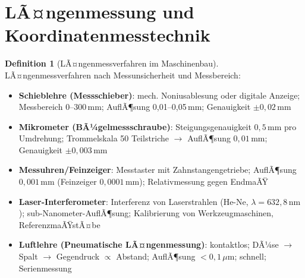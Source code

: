 ﻿\documentclass[a4paper,12pt]{report}
\theoremstyle{definition}
\newtheorem{definition}{Definition}
\begin{document}

\section{LÃ¤ngenmessung und Koordinatenmesstechnik}

\begin{definition}[LÃ¤ngenmessverfahren im Maschinenbau]
LÃ¤ngenmessverfahren nach Messunsicherheit und Messbereich:
\begin{itemize}
    \item[-] \textbf{Schieblehre (Messschieber)}: mech. Noniusablesung oder digitale Anzeige;
          Messbereich 0--300\,mm; AuflÃ¶sung 0{,}01--0{,}05\,mm; Genauigkeit $\pm 0{,}02\,\mathrm{mm}$
    \item[-] \textbf{Mikrometer (BÃ¼gelmessschraube)}: Steigungsgenauigkeit $0{,}5\,\mathrm{mm}$
          pro Umdrehung; Trommelskala 50 Teilstriche $\to$ AuflÃ¶sung $0{,}01\,\mathrm{mm}$;
          Genauigkeit $\pm 0{,}003\,\mathrm{mm}$
    \item[-] \textbf{Messuhren/Feinzeiger}: Messtaster mit Zahnstangengetriebe;
          AuflÃ¶sung $0{,}001\,\mathrm{mm}$ (Feinzeiger $0{,}0001\,\mathrm{mm}$);
          Relativmessung gegen EndmaÃŸ
    \item[-] \textbf{Laser-Interferometer}: Interferenz von Laserstrahlen
          (He-Ne, $\lambda = 632{,}8\,\mathrm{nm}$); sub-Nanometer-AuflÃ¶sung;
          Kalibrierung von Werkzeugmaschinen, ReferenzmaÃŸstÃ¤be
    \item[-] \textbf{Luftlehre (Pneumatische LÃ¤ngenmessung)}: kontaktlos;
          DÃ¼se $\to$ Spalt $\to$ Gegendruck $\propto$ Abstand;
          AuflÃ¶sung $< 0{,}1\,\mu\mathrm{m}$; schnell; Serienmessung
\end{itemize}
\end{definition}
\end{document}
